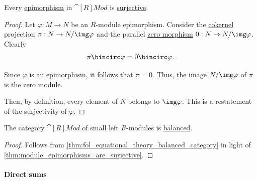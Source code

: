 \begin{proposition}\label{thm:module_epimorphisms_are_surjective}
  Every \hyperref[def:fol_epimorphism]{epimorphism} in \hyperref[def:module/category]{\( \cat[R]{Mod} \)} is \hyperref[def:function_invertibility/surjective]{surjective}.
\end{proposition}
\begin{proof}
  Let \( \varphi: M \to N \) be an \( R \)-module epimorphism. Consider the \hyperref[thm:module_categorical_kernels/cokernel]{cokernel} projection \( \pi: N \to N / \img \varphi \) and the parallel \hyperref[def:zero_morphism]{zero morphism} \( 0: N \to N / \img \varphi \). Clearly
  \begin{equation*}
    \pi \bincirc \varphi = 0 \bincirc \varphi.
  \end{equation*}

  Since \( \varphi \) is an epimorphism, it follows that \( \pi = 0 \). Thus, the image \( N / \img \varphi \) of \( \pi \) is the zero module.

  Then, by definition, every element of \( N \) belongs to \( \img \varphi \). This is a restatement of the surjectivity of \( \varphi \).
\end{proof}

\begin{corollary}\label{thm:category_of_modules_is_balanced}
  The category \( \hyperref[def:module/category]{\cat[R]{Mod}} \) of small left \( R \)-modules is \hyperref[def:balanced_category]{balanced}.
\end{corollary}
\begin{proof}
  Follows from \cref{thm:fol_equational_theory_balanced_category} in light of \cref{thm:module_epimorphisms_are_surjective}.
\end{proof}

\paragraph{Direct sums}

